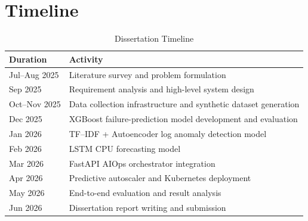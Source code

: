 \documentclass[a4paper,14pt,onecolumn]{report}
\begin{document}
	\chapter{Timeline}
	\begin{table}[H]
	\centering
	\caption{Dissertation Timeline}
	\label{table:timeline}
	\begin{tabular}{|p{4cm}|p{10cm}|}
	\hline
	\textbf{Duration} & \textbf{Activity} \\
	\hline
	Jul--Aug 2025 & Literature survey and problem formulation \\
	\hline
	Sep 2025 & Requirement analysis and high-level system design \\
	\hline
	Oct--Nov 2025 & Data collection infrastructure and synthetic dataset generation \\
	\hline
	Dec 2025 & XGBoost failure-prediction model development and evaluation \\
	\hline
	Jan 2026 & TF--IDF + Autoencoder log anomaly detection model \\
	\hline
	Feb 2026 & LSTM CPU forecasting model \\
	\hline
	Mar 2026 & FastAPI AIOps orchestrator integration \\
	\hline
	Apr 2026 & Predictive autoscaler and Kubernetes deployment \\
	\hline
	May 2026 & End-to-end evaluation and result analysis \\
	\hline
	Jun 2026 & Dissertation report writing and submission \\
	\hline
	\end{tabular}
	\end{table}
	\clearpage

	\renewcommand{\bibname}{References}
	\nocite{*}
	
	
	\clearpage
\end{document}
